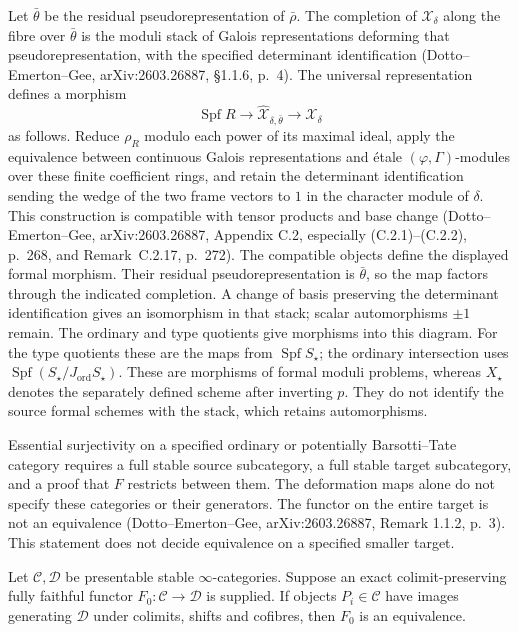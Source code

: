 Let $\bar\theta$ be the residual pseudorepresentation of $\bar\rho$.
The completion of $\mathcal X_\delta$ along the fibre over
$\bar\theta$ is the moduli stack of Galois representations
deforming that pseudorepresentation, with the specified determinant
identification (Dotto--Emerton--Gee, arXiv:2603.26887, \S1.1.6, p.~4).
The universal representation defines a morphism
\[
 \operatorname{Spf}R\longrightarrow
       \widehat{\mathcal X}_{\delta,\bar\theta}
       \longrightarrow\mathcal X_\delta
\]
as follows. Reduce $\rho_R$ modulo each power of its maximal ideal,
apply the equivalence between continuous Galois representations and
\'etale $(\varphi,\Gamma)$-modules over these finite coefficient rings,
and retain the determinant identification sending the wedge of the
two frame vectors to $1$ in the character module of $\delta$.
This construction is compatible with tensor products and base change
(Dotto--Emerton--Gee, arXiv:2603.26887, Appendix C.2, especially (C.2.1)--(C.2.2), p.~268,
and Remark~C.2.17, p.~272).
The compatible objects define the displayed formal morphism.
Their residual pseudorepresentation is $\bar\theta$, so the map
factors through the indicated completion. A change of basis preserving
the determinant identification gives an isomorphism in that stack;
scalar automorphisms $\pm1$ remain. The ordinary and type quotients give
morphisms into this diagram. For the type quotients these are the maps from
$\operatorname{Spf}S_\star$; the ordinary intersection uses
$\operatorname{Spf}(S_\star/J_{\mathrm{ord}}S_\star)$.
These are morphisms of formal moduli problems, whereas $X_\star$
denotes the separately defined scheme after inverting $p$. They do not identify the source formal schemes with the
stack, which retains automorphisms.

Essential surjectivity on a specified ordinary or potentially
Barsotti--Tate category requires a full stable source subcategory,
a full stable target subcategory, and a proof that $F$ restricts
between them. The deformation maps alone do not specify these
categories or their generators. The functor on the entire target
is not an equivalence (Dotto--Emerton--Gee, arXiv:2603.26887, Remark 1.1.2, p.~3).
This statement does not decide equivalence on a specified smaller target.

\begin{proposition}
\label{v4-arith:ordinary-local:generation}
Let $\mathcal C,\mathcal D$ be presentable stable
$\infty$-categories. Suppose an exact colimit-preserving fully
faithful functor $F_0:\mathcal C\to\mathcal D$ is supplied.
If objects $P_i\in\mathcal C$ have images generating $\mathcal D$
under colimits, shifts and cofibres, then $F_0$ is an equivalence.
\end{proposition}

